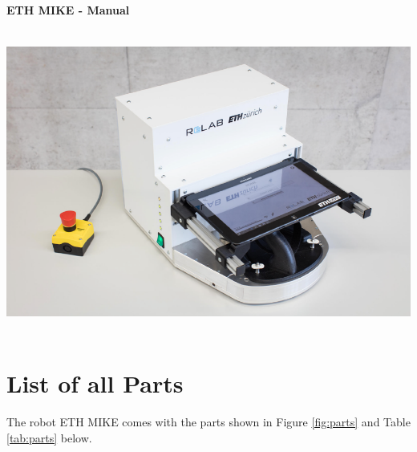 \documentclass[10pt,oneside,a4paper]{article}
\begin{document}
\begin{center}
{\begin{center}
\vspace{-21cm}	
{\Huge \bf ETH MIKE - Manual \par}


\vspace{3cm}
{\hspace*{-1.2cm}	\includegraphics[height=10cm]{images/Hardware/ETHMIKE2.png}}

\end{center}
}
\end{center}

\clearpage

\pagestyle{plain}


\setcounter{tocdepth}{2}

\tableofcontents
\cleardoublepage




\section{List of all Parts}
The robot ETH MIKE comes with the parts shown in Figure \ref{fig:parts} and Table \ref{tab:parts} below.
\end{document}
